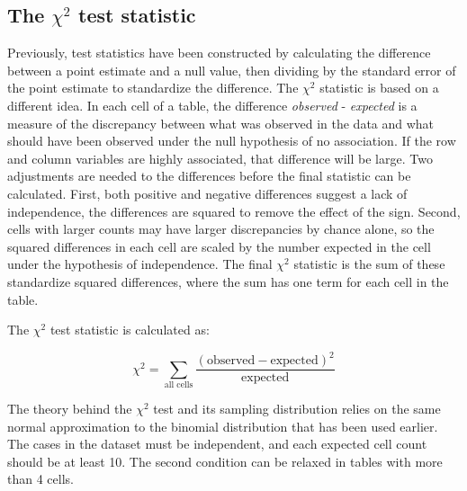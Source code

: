 \subsection{The $\chi^2$ test statistic}

Previously, test statistics have been constructed by calculating the difference between a point estimate and a null value, then dividing by the standard error of the point estimate to standardize the difference. The $\chi^2$ statistic is based on a different idea.  In each cell of a table, the difference \emph{observed} - \emph{expected} is a measure of the discrepancy between what was observed in the data and what should have been observed under the null hypothesis of no association. If the row and column variables are highly associated, that difference will be large.  Two adjustments are needed to the differences before the final statistic can be calculated.  First, both positive and negative differences suggest a lack of independence, the differences are squared to remove the effect of the sign.  Second, cells with larger counts may have larger discrepancies by chance alone, so the squared differences in each cell are scaled by the number expected in the cell under the hypothesis of independence.  The final $\chi^2$ statistic is the sum of these standardize squared differences, where the sum has one term for each cell in the table.

The $\chi^2$ test statistic is calculated as:

\[\chi^2 = \sum_{\text{all cells}} \frac{(\text{observed} - \text{expected})^2}{\text{expected}} \]

The theory behind the $\chi^2$ test and its sampling distribution relies on the same normal approximation to the binomial distribution that has been used earlier.  The cases in the dataset must be independent, and each expected cell count should be at least 10.  The second condition can be relaxed in tables with more than 4 cells.

